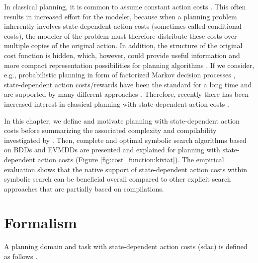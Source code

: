 In classical planning, it is common to assume constant action costs \autocite{fikes-nilsson-aij1971,backstrom-nebel-compint1995}.
This often results in increased effort for the modeler, because when a planning problem inherently involves state-dependent action costs (sometimes called conditional costs), the modeler of the problem must therefore distribute these costs over multiple copies of the original action.
In addition, the structure of the original cost function is hidden, which, however, could provide useful information and more compact representation possibilities for planning algorithms \autocite{geisser-phd2018}.
If we consider, e.g., probabilistic planning in form of factorized Markov decision processes \autocite{puterman-1994}, state-dependent action costs/rewards have been the standard for a long time \autocite{sanner-rddl2010,geisser-phd2018,geisser-et-al-socs2020} and are supported by many different approaches \autocite{keller-eyerich-icaps2012,geisser-speck-ippc2018,cui-khardon-ippc2018}.
Therefore, recently there has been increased interest in classical planning with state-dependent action costs \autocite{keller-geisser-aaai2015,keller-et-al-ijcai2016,geisser-phd2018,corraya-et-al-ki2019,mattmueller-et-al-aaai2018,ivankovic-et-al-icaps2019,haslum-et-al-jair2018,drexler-et-al-icaps2021,drexler-et-al-icaps2020wshsdip}.

In this chapter, we define and motivate planning with state-dependent action costs before summarizing the associated complexity and compilability investigated by \textcite{speck-et-al-icaps2021}.
Then, complete and optimal symbolic search algorithms based on BDDs and EVMDDs are presented and explained for planning with state-dependent action costs \autocite{speck-et-al-ipc2018,speck-et-al-icaps2018} (Figure \ref{fig:cost_function:kiviat}).
The empirical evaluation shows that the native support of state-dependent action costs within symbolic search can be beneficial overall compared to other explicit search approaches that are partially based on compilations.


\section{Formalism}
A planning domain and task with state-dependent action costs (sdac) is defined as follows \autocite{geisser-et-al-ijcai2015,geisser-phd2018}.

